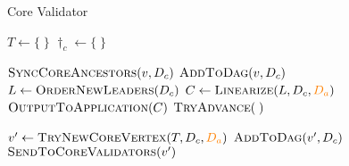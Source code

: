 \begin{algorithm}[t]
    \caption{Core Validator}
    \label{alg:core-validator}
    \algfontsize

    \begin{multicols}{2}
        \begin{algorithmic}[1]
            \State $T \gets \{ \; \}$ 
            \State $\dag_c \gets \{ \; \}$ 

            \Statex
             \label{alg:line:process-core-vertex}
            \State $\Call{SyncCoreAncestors}{v, \dag_c}$ \label{alg:line:sync-core-ancestors}
             \label{alg:line:sync-aux-ancestors}
            \State {} \label{alg:line:valid-core-vertex}
            \State $\Call{AddToDag}{v, \dag_c}$ \label{alg:line:add-to-dag}
            \State $L \gets \Call{OrderNewLeaders}{\dag_c}$ \label{alg:line:commit-leaders}
            \State $C \gets \Call{Linearize}{L, \dag_c, \change{\dag_a}}$ \label{alg:line:linearize}
            \State $\Call{OutputToApplication}{C}$
            \EndIf
            \State $\Call{TryAdvance}{\;}$
            \EndProcedure

            \Statex
             \label{alg:line:try-advance}
            \State $v' \gets \Call{TryNewCoreVertex}{T, \dag_c, \change{\dag_a}}$ \label{alg:line:try-new-core-vertex}
             \Return \EndIf
            \State $\Call{AddToDag}{v', \dag_c}$ \label{alg:line:add-to-dag-2}
            \State $\Call{SendToCoreValidators}{v'}$ \label{alg:line:send-to-core-validators}
            \EndProcedure

            \Statex

            \Statex
        \end{algorithmic}
    \end{multicols}
\end{algorithm}